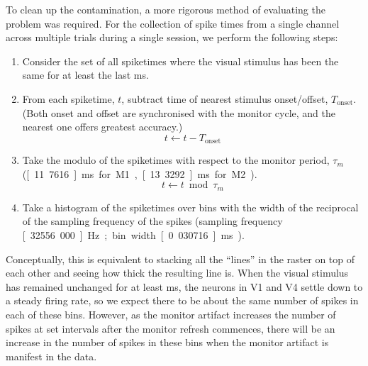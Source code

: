 To clean up the contamination, a more rigorous method of evaluating the problem was required.
For the collection of spike times from a single channel across multiple trials during a single session, we perform the following steps:
\begin{enumerate}
\item Consider the set of all spiketimes where the visual stimulus has been the same for at least the last \unit[150]{ms}.
\item From each spiketime, $t$, subtract time of nearest stimulus onset/offset, $T_{\text{onset}}$. (Both onset and offset are synchronised with the monitor cycle, and the nearest one offers greatest accuracy.)
$$
t \leftarrow t - T_{\text{onset}}
$$
\item Take the modulo of the spiketimes with respect to the monitor period, $\tau_m$ (\unit[11.7616]{ms} for M1, \unit[13.3292]{ms} for M2).
$$
t \leftarrow t \bmod \tau_m
$$
\item Take a histogram of the spiketimes over bins with the width of the reciprocal of the sampling frequency of the spikes (sampling frequency \unit[32556.000]{Hz}; bin width \unit[0.030716]{ms}).
\end{enumerate}
Conceptually, this is equivalent to stacking all the ``lines'' in the raster on top of each other and seeing how thick the resulting line is.
When the visual stimulus has remained unchanged for at least \unit[150]{ms}, the neurons in V1 and V4 settle down to a steady firing rate, so we expect there to be about the same number of spikes in each of these bins. However, as the monitor artifact increases the number of spikes at set intervals after the monitor refresh commences, there will be an increase in the number of spikes in these bins when the monitor artifact is manifest in the data.

